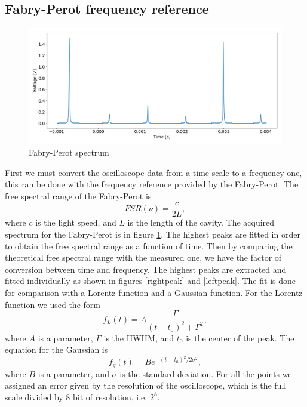 \documentclass[a4paper,10pt]{article}
\begin{document}
\subsection{Fabry-Perot frequency reference}
\begin{figure}[H]
        \includegraphics[width=\textwidth]{fabryperot.png}
\caption{Fabry-Perot spectrum}\label{fabryperot}
\end{figure}
First we must convert the oscilloscope data from a time scale to a frequency one, this can be done with the frequency reference provided by the Fabry-Perot. The free spectral range of the Fabry-Perot is
\begin{equation}\label{fsr}FSR(\nu)= \frac{c}{2L},\end{equation}
where $c$ is the light speed, and $L$ is the length of the cavity. The acquired spectrum for the Fabry-Perot is in figure \ref{fabryperot}. The highest peaks are fitted in order to obtain the free spectral range as a function of time. Then by comparing the theoretical free spectral range with the measured one, we have the factor of conversion between time and frequency. The highest peaks are extracted and fitted individually as shown in figures \ref{rightpeak} and \ref{leftpeak}. The fit is done for comparison with a Lorentz function and a Gaussian function. For the Lorentz function we used the form
\begin{equation}f_L(t) = A \frac{\Gamma}{(t-t_0)^2 + \Gamma^2},\end{equation}
where $A$ is a parameter, $\Gamma$ is the HWHM, and $t_0$ is the center of the peak. The equation for the Gaussian is
\begin{equation} f_g(t) = Be^{-(t - t_0)^2/2\sigma^2},\end{equation}
where $B$ is a parameter, and $\sigma$ is the standard deviation. For all the points we assigned an error given by the resolution of the oscilloscope, which is the full scale divided by 8 bit of resolution, i.e. $2^8$.
\end{document}
